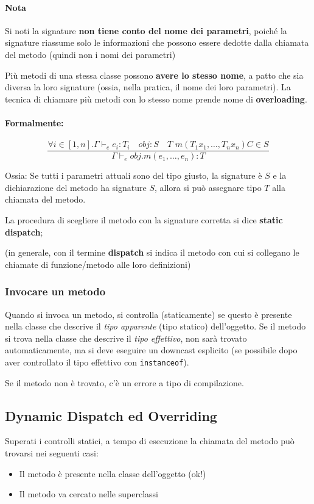 \documentclass[a4paper,10pt]{article}
\begin{document}
\paragraph{Nota} Si noti la signature \textbf{non tiene conto del nome dei parametri}, poiché la signature riassume solo le informazioni che possono essere dedotte dalla chiamata del metodo (quindi non i nomi dei parametri)\medskip


Più metodi di una stessa classe possono \textbf{avere lo stesso nome}, a patto che sia diversa la loro signature (ossia, nella pratica, il nome dei loro parametri). La tecnica di chiamare più metodi con lo stesso nome prende nome di \textbf{overloading}.

\paragraph{Formalmente:}
\[ \dfrac{\forall i \in [1, n]. \Gamma \vdash_e e_i : T_i \quad obj : S \quad T\,\, m(T_1 x_1 , \hdots, T_n x_n)C \in S}{\Gamma \vdash_e obj.m(e_1, \hdots, e_n) : T} \]

Ossia: Se tutti i parametri attuali sono del tipo giusto, la signature è $S$ e la dichiarazione del metodo ha signature $S$, allora si può assegnare tipo $T$ alla chiamata del metodo.
\smallskip

La procedura di scegliere il metodo con la signature corretta si dice \textbf{static dispatch}; \smallskip

(in generale, con il termine \textbf{dispatch} si indica il metodo con cui si collegano le chiamate di funzione/metodo alle loro definizioni)
\subsubsection{Invocare un metodo}

Quando si invoca un metodo, si controlla (staticamente) se questo è presente nella classe che descrive il \emph{tipo apparente} (tipo statico) dell'oggetto. Se il metodo si trova nella classe che descrive il \emph{tipo effettivo}, non sarà trovato automaticamente, ma si deve eseguire un downcast esplicito (se possibile dopo aver controllato il tipo effettivo con \texttt{instanceof}).\smallskip

Se il metodo non è trovato, c'è un errore a tipo di compilazione. 


\subsection{Dynamic Dispatch ed Overriding}
Superati i controlli statici, a tempo di esecuzione la chiamata del metodo può trovarsi nei seguenti casi:
\begin{itemize}
 \item Il metodo è presente nella classe dell'oggetto (ok!)
 \item Il metodo va cercato nelle superclassi
\end{itemize}
\end{document}
